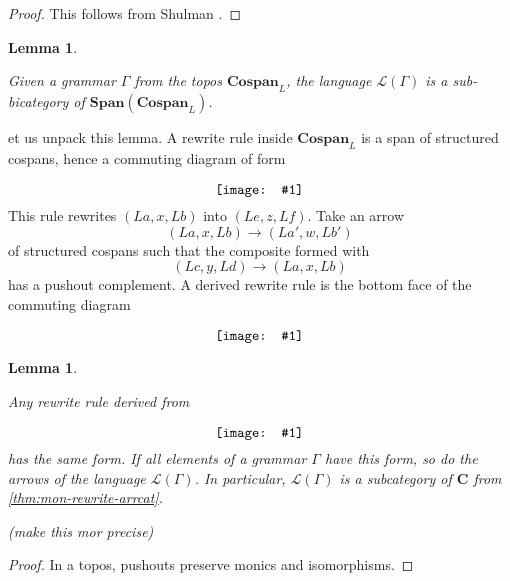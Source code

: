 \documentclass{amsart}
\newcommand{\C}{\cat{C}}
\newcommand{\cat}[1]{\mathbf{#1}}
\newcommand{\diagram}[1]{\raisebox{-0.5\height}{\texttt{[image: \#1]}}}
\newcommand{\Span}{\mathbf{Span}}
\newcommand{\Cospan}{\mathbf{Cospan}}
\newcommand{\edit}[1]{\textcolor{editcolour}{(#1)}}
\newenvironment{exposition}[1]{}{}
\newtheorem{lemma}[theorem]{Lemma}
\theoremstyle{remark}
\theoremstyle{definition}
\begin{document}
\begin{proof}
  
  This follows from Shulman \cite{shulman-constructing}.
  
\end{proof}

\begin{lemma}
  \label{thm:lr_open-objects-language}

  Given a grammar $ \Gamma $ from the topos $ \Cospan_L $, the
  language $ \mathcal{L}(\Gamma) $ is a sub-bicategory of
  $ \Span ( \Cospan_{L} ) $.
  
\end{lemma}

\begin{exposition}

  Let us unpack this lemma.  A rewrite rule inside \( \Cospan_L \) is
  a span of structured cospans, hence a commuting diagram of form
  \[
    \diagram{diag_lr_rewr-struct-cospans}
  \]
  This rule rewrites \( ( La , x , Lb ) \)
  into \( (  Le , z , Lf ) \). Take an arrow 
  \[
    ( La , x , Lb ) \to ( La' , w , Lb' )
  \]
  of structured cospans such that the composite formed with
  \[
    ( Lc , y , Ld) \to ( La , x , Lb)
  \]
  has a pushout complement. A derived rewrite rule is the bottom
  face of the commuting diagram
  \[
    \diagram{diag_lr_-derived-rewrite-rule}
  \]
  
\end{exposition}

\begin{lemma}
  \label{thm:der-rewr-rule-dbl-monic}

  Any rewrite rule derived from 
  \[
    \diagram{diag_lr-grammar-2cell}
  \]
  has the same form. If all elements of a grammar \( \Gamma \) have
  this form, so do the arrows of the language
  \( \mathcal{L} (\Gamma) \).  In particular, \( \mathcal{L} (\Gamma)
  \) is a subcategory of \( \C \) from \ref{thm:mon-rewrite-arrcat}.

  \edit{make this mor precise}
  
\end{lemma}

\begin{proof}

  In a topos, pushouts preserve monics and isomorphisms.
  
\end{proof}
\end{document}
